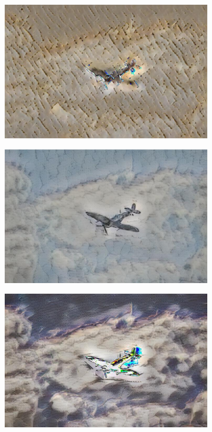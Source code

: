 \begin{figure}[h]
    \centering
    \begin{subfigure}[b]{0.19\linewidth}
        \includegraphics[width=\linewidth]{fig/islam_dataset/islam_1.pdf}
    \end{subfigure}
    \begin{subfigure}[b]{0.19\linewidth}
        \includegraphics[width=\linewidth]{fig/islam_dataset/islam_2.pdf}
    \end{subfigure}
    \begin{subfigure}[b]{0.19\linewidth}
        \includegraphics[width=\linewidth]{fig/islam_dataset/islam_3.pdf}

\end{subfigure}
\end{figure}

